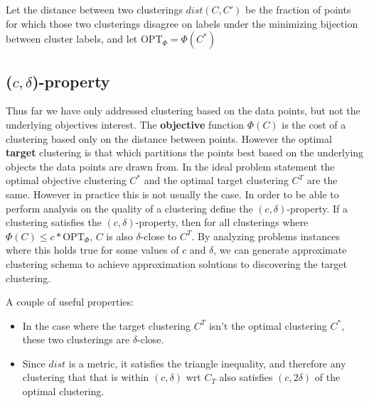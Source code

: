 \documentclass[paper=a4, fontsize=11pt]{scrartcl} %
\numberwithin{equation}{section} %
\numberwithin{figure}{section} %
\numberwithin{table}{section} %
\begin{document}
Let the distance between two clusterings $dist(C, C')$ be the 
fraction of points for which those two clusterings disagree on labels under the minimizing bijection between cluster labels, and let $\text{OPT}_\Phi = \Phi(C^*)$

\subsection{($c, \delta$)-property}
Thus far we have only addressed clustering based on the data points, but not the underlying objectives interest. The \textbf{objective} function $\Phi(C)$ is the cost of a clustering based only on the distance between points. However the optimal \textbf{target} clustering is that which partitions the points best based on the underlying objects the data points are drawn from. In the ideal problem statement the optimal objective clustering $C^*$ and the optimal target clustering $C^T$ are the same. However in practice this is not usually the case. In order to be able to perform analysis on the quality of a clustering \cite{firstpaper} define the $(c, \delta)$-property.  If a clustering satisfies the $(c, \delta)$-property, then for all clusterings where $\Phi(C) \leq c*\text{OPT}_\Phi$, $C$ is also $\delta$-close to $C^T$. By analyzing problems instances where this holds true for some values of $c$ and $\delta$, we can generate approximate clustering schema to achieve approximation solutions to discovering the target clustering.

 A couple of useful properties:

\begin{itemize}

\item In the case where the target clustering $C^T$ isn't the optimal clustering $C^*$, these two clusterings are $\delta$-close.

\item Since $dist$ is a metric, it satisfies the triangle inequality, and therefore any clustering that that is within $(c, \delta)$ wrt $C_T$ also satisfies $(c, 2\delta)$ of the optimal clustering. %



\end{itemize}

\end{document}
